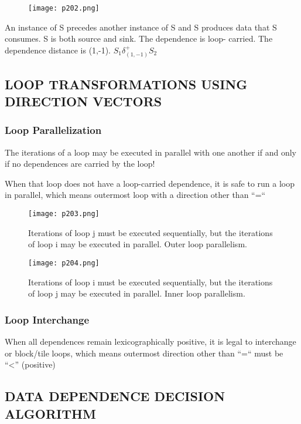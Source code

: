 \begin{figure}[H]
	\centering
	\texttt{[image: p202.png]}
	\caption{}
	\label{fig:p202}
\end{figure}


An instance of S precedes
another instance of S and
S produces data that S
consumes. S is both source and sink. The dependence is loop-
carried.
The dependence distance
is (1,-1). $S_1 \delta^{+}_{(1,-1)} S_2$


\subsection{LOOP TRANSFORMATIONS USING DIRECTION VECTORS}

\subsubsection{Loop Parallelization}

The iterations of a loop may be executed
in parallel with one another if and only if
no dependences are carried by the loop!

When that loop does not have a loop-carried dependence, it 
is safe to run a loop in parallel, which means
 outermost loop with a direction other than “=“

 \begin{figure}[H]
	\centering
	\texttt{[image: p203.png]}
	\caption{Iterations of loop j must be executed sequentially, but the
    iterations of loop i may be executed in parallel. Outer loop parallelism.}
	\label{fig:p203}
\end{figure}


\begin{figure}[H]
	\centering
	\texttt{[image: p204.png]}
	\caption{Iterations of loop i must be executed sequentially, but the
    iterations of loop j may be executed in parallel. Inner loop parallelism.}
	\label{fig:p204}
\end{figure}

\subsubsection{Loop Interchange}

When all dependences remain lexicographically positive,
it is legal to interchange or block/tile loops, which means
outermost direction other than “=“ must be “<” (positive)



\subsection{DATA DEPENDENCE DECISION ALGORITHM}